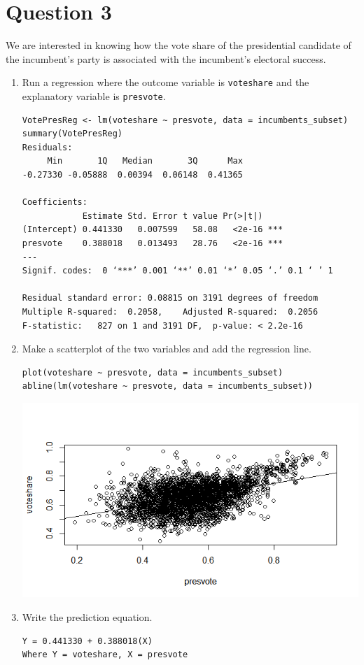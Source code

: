 \documentclass[12pt,letterpaper]{article}
\begin{document}
	\newpage	
\section*{Question 3}

\noindent We are interested in knowing how the vote share of the presidential candidate of the incumbent's party is associated with the incumbent's electoral success.
	\vspace{.25cm}
	\begin{enumerate}
		\item Run a regression where the outcome variable is \texttt{voteshare} and the explanatory variable is \texttt{presvote}.
\begin{verbatim}
VotePresReg <- lm(voteshare ~ presvote, data = incumbents_subset)
summary(VotePresReg)        
Residuals:
     Min       1Q   Median       3Q      Max 
-0.27330 -0.05888  0.00394  0.06148  0.41365 

Coefficients:
            Estimate Std. Error t value Pr(>|t|)    
(Intercept) 0.441330   0.007599   58.08   <2e-16 ***
presvote    0.388018   0.013493   28.76   <2e-16 ***
---
Signif. codes:  0 ‘***’ 0.001 ‘**’ 0.01 ‘*’ 0.05 ‘.’ 0.1 ‘ ’ 1

Residual standard error: 0.08815 on 3191 degrees of freedom
Multiple R-squared:  0.2058,	Adjusted R-squared:  0.2056 
F-statistic:   827 on 1 and 3191 DF,  p-value: < 2.2e-16
\end{verbatim}
			\vspace{5cm}
		\item Make a scatterplot of the two variables and add the regression line. 
\begin{verbatim}
plot(voteshare ~ presvote, data = incumbents_subset)
abline(lm(voteshare ~ presvote, data = incumbents_subset))
\end{verbatim}
\includegraphics[width=.75\textwidth]{Rplot3}
			\vspace{5cm}
		\item Write the prediction equation.
\begin{verbatim}
Y = 0.441330 + 0.388018(X)
Where Y = voteshare, X = presvote
\end{verbatim}
	\end{enumerate}
	
\end{document}
